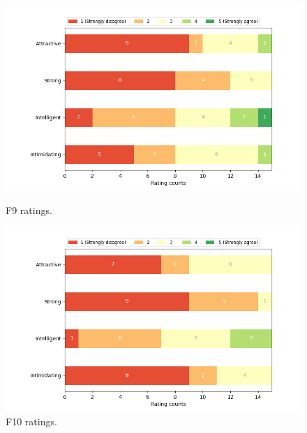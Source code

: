\begin{figure}[H]
  \includegraphics[width=\linewidth]{Survey/FRatings/avatar_f9.png}
  \caption{F9 ratings.}
\endminipage\hfill
{}
  \includegraphics[width=\linewidth]{Survey/FRatings/avatar_f10.png}
  \caption{F10 ratings.}
\endminipage\hfill
\end{figure}
